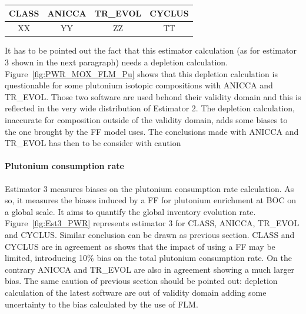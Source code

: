\begin{table}[h]
	\begin{center}
		\begin{tabular}{|c||c||c||c|}
			\hline 
				CLASS & ANICCA & TR\_EVOL & CYCLUS \\
			\hline
				XX & YY & ZZ & TT \\
		\end{tabular}
	\end{center}
	\label{table:Est2_PWR}
\end{table}

It has to be pointed out the fact that this estimator calculation (as for
estimator 3 shown in the next paragraph) needs a depletion calculation.
Figure~\ref{fig:PWR_MOX_FLM_Pu} shows that this depletion calculation is
questionable for some plutonium isotopic compositions with ANICCA and TR\_EVOL.
Those two software are used behond their validity domain and this is reflected
in the very wide distribution of Estimator 2. The depletion calculation,
inaccurate for composition outside of the validity domain, adds some biases to
the one brought by the FF model uses. The conclusions made with ANICCA and
TR\_EVOL has then to be consider with caution

\paragraph{Plutonium consumption rate}

Estimator 3 measures biases on the plutonium consumption rate calculation. As
so, it measures the biases induced by a FF for plutonium enrichment at BOC on a
global scale. It aims to quantify the global inventory evolution rate.
Figure~\ref{fig:Est3_PWR} represents estimator 3 for CLASS, ANICCA, TR\_EVOL and
CYCLUS. Similar conclusion can be drawn as previous section. CLASS and CYCLUS
are in agreement as shows that the impact of using a FF may be limited,
introducing 10\% bias on the total plutonium consumption rate. On the contrary
ANICCA and TR\_EVOL are also in agreement showing a much larger bias. The same
caution of previous section should be pointed out: depletion calculation of the
latest software are out of validity domain adding some uncertainty to the bias
calculated by the use of FLM.       

